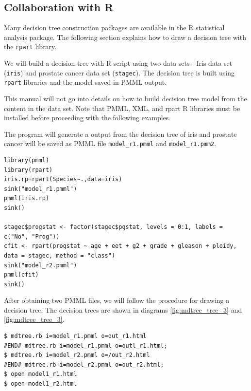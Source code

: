 \subsection{Collaboration with R}

Many decision tree construction packages are available in the R statistical analysis package.
The following section explains how to draw a decision tree with the \verb|rpart| library. 

We will build a decision tree with R script using two data sets - Iris data set (\verb|iris|) and prostate cancer data set (\verb|stagec|).
The decision tree is built using \verb|rpart| libraries and the model saved in PMML output. 

This manual will not go into details on how to build  decision tree model from the content in the data set. Note that PMML, XML, and rpart R libraries must be installed before proceeding with the following examples. 

The program will generate a output from the decision tree of iris and prostate cancer will be saved as PMML file \verb|model_r1.pmml| and \verb|model_r1.pmm2|. 


\begin{Verbatim}[baselinestretch=0.7,frame=single]
library(pmml)
library(rpart)
iris.rp=rpart(Species~.,data=iris)
sink("model_r1.pmml")
pmml(iris.rp)
sink()

stagec$progstat <- factor(stagec$pgstat, levels = 0:1, labels = c("No", "Prog"))
cfit <- rpart(progstat ~ age + eet + g2 + grade + gleason + ploidy, data = stagec, method = "class")
sink("model_r2.pmml")
pmml(cfit)
sink()
\end{Verbatim}

After obtaining two PMML files, we will follow the procedure for drawing a decision tree.
The decision trees are shown in diagrams \ref{fig:mdtree_tree_3} and  \ref{fig:mdtree_tree_3}.  

\begin{Verbatim}[baselinestretch=0.7,frame=single]
$ mdtree.rb i=model_r1.pmml o=out_r1.html
#END# mdtree.rb i=model_r1.pmml o=outl_r1.html;
$ mdtree.rb i=model_r2.pmml o=/out_r2.html
#END# mdtree.rb i=model_r2.pmml o=out_r2.html;
$ open model1_r1.html
$ open model1_r2.html
\end{Verbatim}

